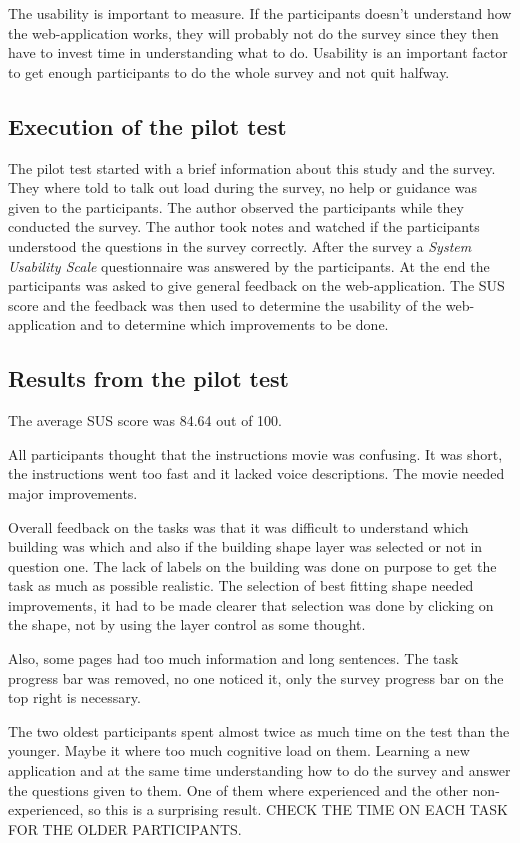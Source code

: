 The usability is important to measure. If the participants doesn't understand how the web-application works, they will probably not do the survey since they then have to invest time in understanding what to do. %
Usability is an important factor to get enough participants to do the whole survey and not quit halfway. 

\subsection{Execution of the pilot test}
The pilot test started with a brief information about this study and the survey. They where told to talk out load during the survey, no help or guidance was given to the participants. The author observed the participants while they conducted the survey. The author took notes and watched if the participants understood the questions in the survey correctly. After the survey a \textit{System Usability Scale} questionnaire was answered by the participants. At the end the participants was asked to give general feedback on the web-application. The SUS score and the feedback was then used to determine the usability of the web-application and to determine which improvements to be done.  

\subsection{Results from the pilot test}
The average SUS score was 84.64 out of 100. 

All participants thought that the instructions movie was confusing. It was short, the instructions went too fast and it lacked voice descriptions. The movie needed major improvements. 

Overall feedback on the tasks was that it was difficult to understand which building was which and also if the building shape layer was selected or not in question one. The lack of labels on the building was done on purpose to get the task as much as possible realistic. The selection of best fitting shape needed improvements, it had to be made clearer that selection was done by clicking on the shape, not by using the layer control as some thought. 
 
Also, some pages had too much information and long sentences. The task progress bar was removed, no one noticed it, only the survey progress bar on the top right is necessary. 

The two oldest participants spent almost twice as much time on the test than the younger. Maybe it where too much cognitive load on them. Learning a new application and at the same time understanding how to do the survey and answer the questions given to them. One of them where experienced and the other non-experienced, so this is a surprising result.  CHECK THE TIME ON EACH TASK FOR THE OLDER PARTICIPANTS. 

